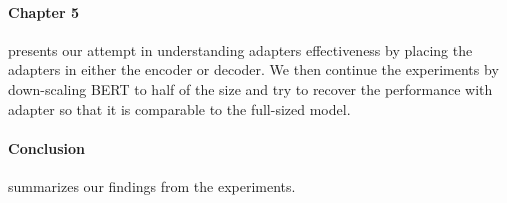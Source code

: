 \paragraph{Chapter 5} presents our attempt in understanding adapters effectiveness by placing the adapters in either the encoder or decoder. We then continue the experiments by down-scaling BERT to half of the size and try to recover the performance with adapter so that it is comparable to the full-sized model.

\paragraph{Conclusion} summarizes our findings from the experiments.